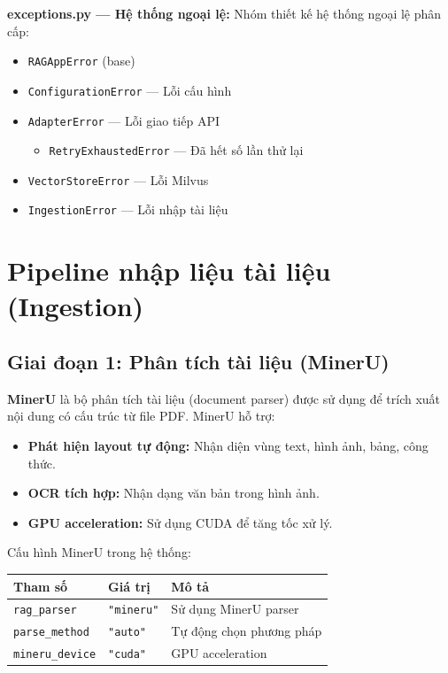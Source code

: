 \documentclass[12pt,a4paper]{article}
\begin{document}
\textbf{exceptions.py --- Hệ thống ngoại lệ:} Nhóm thiết kế hệ thống ngoại lệ phân cấp:

\begin{itemize}
  \item \texttt{RAGAppError} (base)
  \item \texttt{ConfigurationError} --- Lỗi cấu hình
  \item \texttt{AdapterError} --- Lỗi giao tiếp API
    \begin{itemize}
      \item \texttt{RetryExhaustedError} --- Đã hết số lần thử lại
    \end{itemize}
  \item \texttt{VectorStoreError} --- Lỗi Milvus
  \item \texttt{IngestionError} --- Lỗi nhập tài liệu
\end{itemize}

\section{Pipeline nhập liệu tài liệu (Ingestion)}

\subsection{Giai đoạn 1: Phân tích tài liệu (MinerU)}

\textbf{MinerU} là bộ phân tích tài liệu (document parser) được sử dụng để trích xuất nội dung có cấu trúc từ file PDF. MinerU hỗ trợ:

\begin{itemize}
  \item \textbf{Phát hiện layout tự động:} Nhận diện vùng text, hình ảnh, bảng, công thức.
  \item \textbf{OCR tích hợp:} Nhận dạng văn bản trong hình ảnh.
  \item \textbf{GPU acceleration:} Sử dụng CUDA để tăng tốc xử lý.
\end{itemize}

Cấu hình MinerU trong hệ thống:

\begin{table}[H]
\centering
\begin{tabular}{lll}
\toprule
\textbf{Tham số} & \textbf{Giá trị} & \textbf{Mô tả} \\
\midrule
\texttt{rag\_parser} & \texttt{"mineru"} & Sử dụng MinerU parser \\
\texttt{parse\_method} & \texttt{"auto"} & Tự động chọn phương pháp \\
\texttt{mineru\_device} & \texttt{"cuda"} & GPU acceleration \\
\bottomrule
\end{tabular}
\end{table}
\end{document}

